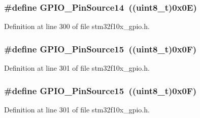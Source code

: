 \subsubsection[{\texorpdfstring{G\+P\+I\+O\+\_\+\+Pin\+Source14}{GPIO_PinSource14}}]{\setlength{\rightskip}{0pt plus 5cm}\#define G\+P\+I\+O\+\_\+\+Pin\+Source14~(({\bf uint8\+\_\+t})0x0\+E)}\hypertarget{group___g_p_i_o___pin__sources_ga5fbb540a86af4015a46ac16c61ddb1f7}{}\label{group___g_p_i_o___pin__sources_ga5fbb540a86af4015a46ac16c61ddb1f7}


Definition at line 300 of file stm32f10x\+\_\+gpio.\+h.

\subsubsection[{\texorpdfstring{G\+P\+I\+O\+\_\+\+Pin\+Source15}{GPIO_PinSource15}}]{\setlength{\rightskip}{0pt plus 5cm}\#define G\+P\+I\+O\+\_\+\+Pin\+Source15~(({\bf uint8\+\_\+t})0x0\+F)}\hypertarget{group___g_p_i_o___pin__sources_ga9b29d9a9ecb1579ecedf4ea53ccbfd5b}{}\label{group___g_p_i_o___pin__sources_ga9b29d9a9ecb1579ecedf4ea53ccbfd5b}


Definition at line 301 of file stm32f10x\+\_\+gpio.\+h.

\subsubsection[{\texorpdfstring{G\+P\+I\+O\+\_\+\+Pin\+Source15}{GPIO_PinSource15}}]{\setlength{\rightskip}{0pt plus 5cm}\#define G\+P\+I\+O\+\_\+\+Pin\+Source15~(({\bf uint8\+\_\+t})0x0\+F)}\hypertarget{group___g_p_i_o___pin__sources_ga9b29d9a9ecb1579ecedf4ea53ccbfd5b}{}\label{group___g_p_i_o___pin__sources_ga9b29d9a9ecb1579ecedf4ea53ccbfd5b}


Definition at line 301 of file stm32f10x\+\_\+gpio.\+h.

